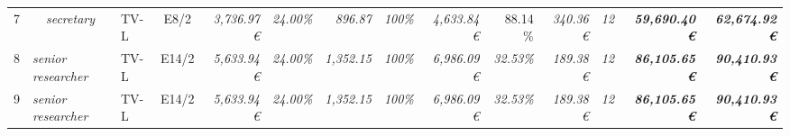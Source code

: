 \begin{table}[]
\begin{tabular}{clllcrrrrrrrrrr}
7                                                                                       & \multicolumn{2}{c}{\cellcolor[HTML]{FFFF99}\textit{secretary}}                        & \cellcolor[HTML]{FFFF99}TV-L      & \cellcolor[HTML]{FFFF99}E8/2                 & \cellcolor[HTML]{FFFF99}\textit{3,736.97 €}         & \textit{24.00\%}                                      & \textit{896.87}                              & \cellcolor[HTML]{FFFF99}\textit{100\%}                  & \cellcolor[HTML]{92D050}\textit{4,633.84 €}  & 88.14 \%                                       & \cellcolor[HTML]{92D050}\textit{340.36 €}    & \cellcolor[HTML]{FFFF99}\textit{12}          & \cellcolor[HTML]{BFBFBF}\textit{\textbf{59,690.40 €}}           & \textit{\textbf{62,674.92 €}}                                                                 \\
8                                                                                       & \multicolumn{2}{l}{\cellcolor[HTML]{FFFF99}\textit{senior researcher}}                & \cellcolor[HTML]{FFFF99}TV-L      & \cellcolor[HTML]{FFFF99}E14/2                & \cellcolor[HTML]{FFFF99}\textit{5,633.94 €}         & \textit{24.00\%}                                      & \textit{1,352.15}                            & \cellcolor[HTML]{FFFF99}\textit{100\%}                  & \cellcolor[HTML]{92D050}\textit{6,986.09 €}  & \cellcolor[HTML]{FFFF99}\textit{32.53\%}       & \cellcolor[HTML]{92D050}\textit{189.38 €}    & \cellcolor[HTML]{FFFF99}\textit{12}          & \cellcolor[HTML]{BFBFBF}\textit{\textbf{86,105.65 €}}           & \textit{\textbf{90,410.93 €}}                                                                 \\
9                                                                                       & \multicolumn{2}{l}{\cellcolor[HTML]{FFFF99}\textit{senior researcher}}                & \cellcolor[HTML]{FFFF99}TV-L      & \cellcolor[HTML]{FFFF99}E14/2                & \cellcolor[HTML]{FFFF99}\textit{5,633.94 €}         & \textit{24.00\%}                                      & \textit{1,352.15}                            & \cellcolor[HTML]{FFFF99}\textit{100\%}                  & \cellcolor[HTML]{92D050}\textit{6,986.09 €}  & \cellcolor[HTML]{FFFF99}\textit{32.53\%}       & \cellcolor[HTML]{92D050}\textit{189.38 €}    & \cellcolor[HTML]{FFFF99}\textit{12}          & \cellcolor[HTML]{BFBFBF}\textit{\textbf{86,105.65 €}}           & \textit{\textbf{90,410.93 €}}                                                                 \\

\end{tabular}
\end{table}
